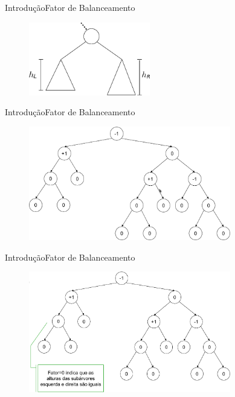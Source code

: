 \documentclass[aspectratio=169]{beamer}
\begin{document}
\begin{frame}{Introdução}{Fator de Balanceamento}
\begin{figure}[!h]
  \centering
   \includegraphics[width=150pt]{imagens/alturas_subarvores.png}
  \label{fig_alturas_subarvores}
\end{figure}
\end{frame}


\begin{frame}{Introdução}{Fator de Balanceamento}
\begin{figure}[!h]
  \centering
   \includegraphics[width=250pt]{imagens/fator_balanceamento.png}
  \label{fig_fator_balanceamento}
\end{figure}
\end{frame}


\begin{frame}{Introdução}{Fator de Balanceamento}
\begin{figure}[!h]
  \centering
   \includegraphics[width=250pt]{imagens/fator_balanceamento1.png}
  \label{fig_fator_balanceamento1}
\end{figure}
\end{frame}
\end{document}
